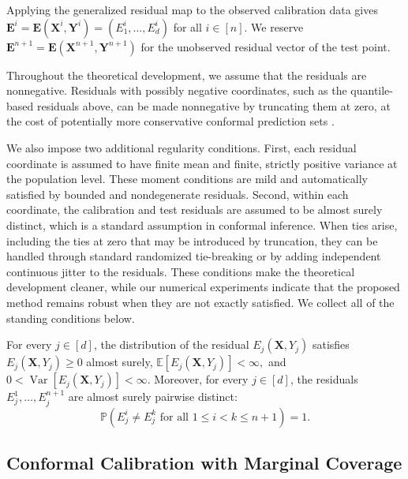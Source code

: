 {Applying the generalized residual map to the observed calibration data gives
$\mathbf{E}^i=\mathbf E(\mathbf X^i,\mathbf Y^i)=(E_1^i,\ldots,E_d^i)$ for all
$i\in[n]$. We reserve
$\mathbf{E}^{n+1}=\mathbf E(\mathbf X^{n+1},\mathbf Y^{n+1})$ for the
unobserved residual vector of the test point.

Throughout the theoretical development, we assume that the residuals are nonnegative. Residuals with possibly negative coordinates, such as the quantile-based residuals above, can be made nonnegative by truncating them at zero, at the cost of potentially more conservative conformal prediction sets \citep{romano2019conformalized}.

We also impose two additional regularity conditions. First, each residual
coordinate is assumed to have finite mean and finite, strictly positive
variance at the population level. These moment conditions are mild and automatically satisfied by bounded and nondegenerate
residuals. Second, within each
coordinate, the calibration and test residuals are assumed to be almost surely
distinct, which is a standard assumption in conformal inference.
When ties arise, including the ties at zero that may be introduced by
truncation, they can be handled through standard randomized tie-breaking or
by adding independent continuous jitter to the residuals. These conditions
make the theoretical development cleaner, while our numerical experiments
indicate that the proposed method remains robust when they are not exactly
satisfied. We collect all of the standing conditions below.

\begin{assumption}
\label{eq:assumption-scores}
For every $j\in[d]$, the distribution of the residual $E_j(\mathbf X,Y_j)$ satisfies $E_j(\mathbf X,Y_j)\geq 0 $ almost surely, $
\mathbb E[E_j(\mathbf X,Y_j)]<\infty, $ and $
0<\operatorname{Var}[E_j(\mathbf X,Y_j)]<\infty.$
Moreover, for every $j\in[d]$, the residuals
$E_j^1,\ldots,E_j^{n+1}$ are almost surely pairwise distinct:
\[
\mathbb P\left(
E_j^i\neq E_j^k
\text{ for all }1\leq i<k\leq n+1
\right)=1.
\]
\end{assumption}
}


\subsection{Conformal Calibration with Marginal Coverage}\label{sec:calibration}

